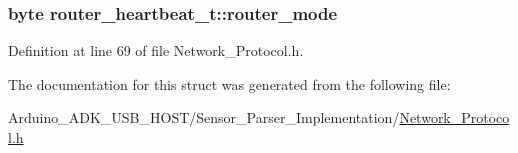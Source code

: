 \hypertarget{structrouter__heartbeat__t_a5c266b86dacfbe3b19ec81becc8b281e}{
\subsubsection[{router\-\_\-mode}]{\setlength{\rightskip}{0pt plus 5cm}byte router\-\_\-heartbeat\-\_\-t\-::router\-\_\-mode}}\label{structrouter__heartbeat__t_a5c266b86dacfbe3b19ec81becc8b281e}


Definition at line 69 of file Network\-\_\-\-Protocol.\-h.



The documentation for this struct was generated from the following file\-:\begin{DoxyCompactItemize}
\item 
Arduino\-\_\-\-A\-D\-K\-\_\-\-U\-S\-B\-\_\-\-H\-O\-S\-T/\-Sensor\-\_\-\-Parser\-\_\-\-Implementation/\hyperlink{_network___protocol_8h}{Network\-\_\-\-Protocol.\-h}\end{DoxyCompactItemize}
